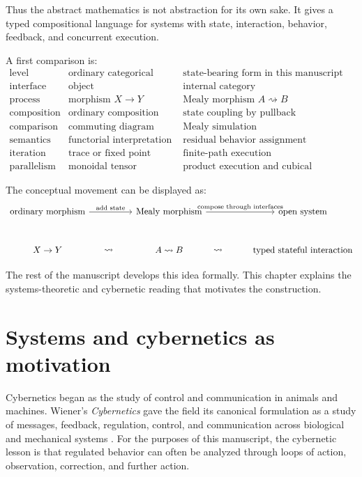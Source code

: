 Thus the abstract mathematics is not abstraction for its own sake.  It gives a
typed compositional language for systems with state, interaction, behavior,
feedback, and concurrent execution.

A first comparison is:
\[
\begin{array}{c|c|c}
\text{level}
&
\text{ordinary categorical form}
&
\text{state-bearing form in this manuscript}
\\
\hline
\text{interface}
&
\text{object}
&
\text{internal category}
\\
\text{process}
&
\text{morphism }X\to Y
&
\text{Mealy morphism }A\rightsquigarrow B
\\
\text{composition}
&
\text{ordinary composition}
&
\text{state coupling by pullback}
\\
\text{comparison}
&
\text{commuting diagram}
&
\text{Mealy simulation}
\\
\text{semantics}
&
\text{functorial interpretation}
&
\text{residual behavior assignment}
\\
\text{iteration}
&
\text{trace or fixed point}
&
\text{finite-path execution}
\\
\text{parallelism}
&
\text{monoidal tensor}
&
\text{product execution and cubical resolution}
\end{array}
\]

The conceptual movement can be displayed as:
\[
\begin{tikzcd}[column sep=huge,row sep=large]
  \text{ordinary morphism}
    \ar[r,"\text{add state}"]
  &
  \text{Mealy morphism}
    \ar[r,"\text{compose through interfaces}"]
  &
  \text{open system}
  \\
  X\to Y
    \ar[r,phantom,"\leadsto" description]
  &
  A\rightsquigarrow B
    \ar[r,phantom,"\leadsto" description]
  &
  \text{typed stateful interaction}
\end{tikzcd}
\]

The rest of the manuscript develops this idea formally.  This chapter explains
the systems-theoretic and cybernetic reading that motivates the construction.

\section{Systems and cybernetics as motivation}
\label{sec:systems-and-cybernetics-motivation}

Cybernetics began as the study of control and communication in animals and
machines.  Wiener's \emph{Cybernetics} gave the field its canonical
formulation as a study of messages, feedback, regulation, control, and
communication across biological and mechanical systems
\cite{Wiener1948Cybernetics}.  For the purposes of this manuscript, the
cybernetic lesson is that regulated behavior can often be analyzed through
loops of action, observation, correction, and further action.

